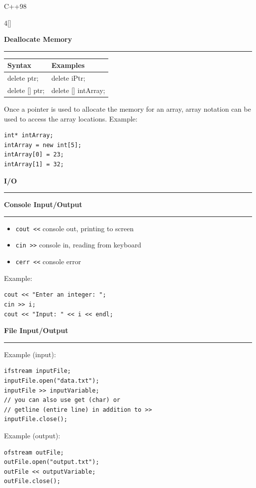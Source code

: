 \documentclass[final]{beamer}
\renewcommand{\section}[1]{%
  \par\vspace{1em}%
  {\noindent\Large\bfseries #1\par}%
  \vspace{0.5em}\hrule\vspace{1em}%
}
\renewcommand{\subsection}[1]{%
  \par\vspace{1em}%
  {\noindent\large\bfseries #1\par}%
  \vspace{0.5em}\hrule\vspace{1em}%
}
\begin{document}
\begin{frame}[t,fragile]{C++98}
\begin{multicols}{4}[\setlength{\columnsep}{1.5cm}]

\subsection{Deallocate Memory}
\begin{tabular}{|l|l|}
\hline
\textbf{Syntax} & \textbf{Examples} \\
\hline
delete ptr; & delete iPtr; \\
\hline
delete [] ptr; & delete [] intArray; \\
\hline
\end{tabular}

Once a pointer is used to allocate the memory for an array, array notation can be used to access the array locations.
Example:
\begin{lstlisting}
int* intArray;
intArray = new int[5];
intArray[0] = 23;
intArray[1] = 32;
\end{lstlisting}
\section{I/O}
 \subsection{ Console Input/Output}
\begin{itemize}
    \item \texttt{cout <<} console out, printing to screen
    \item \texttt{cin >>} console in, reading from keyboard
    \item \texttt{cerr <<} console error
\end{itemize}
Example:
\begin{lstlisting}
cout << "Enter an integer: ";
cin >> i;
cout << "Input: " << i << endl;
\end{lstlisting}

 \subsection{ File Input/Output}
Example (input):
\begin{lstlisting}
ifstream inputFile;
inputFile.open("data.txt");
inputFile >> inputVariable;
// you can also use get (char) or
// getline (entire line) in addition to >>
inputFile.close();
\end{lstlisting}
Example (output):
\begin{lstlisting}
ofstream outFile;
outFile.open("output.txt");
outFile << outputVariable;
outFile.close();
\end{lstlisting}

\end{multicols}
\end{frame}
\end{document}
